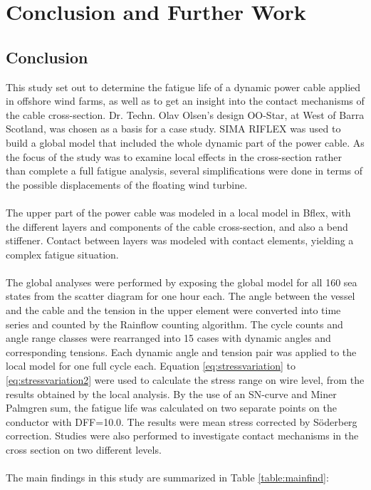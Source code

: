 \chapter{Conclusion and Further Work}
\label{chap:conclusion}
\section{Conclusion}
This study set out to determine the fatigue life of a dynamic power cable applied in offshore wind farms, as well as to get an insight into the contact mechanisms of the cable cross-section. Dr. Techn. Olav Olsen's design OO-Star, at West of Barra Scotland, was chosen as a basis for a case study. SIMA RIFLEX was used to build a global model that included the whole dynamic part of the power cable.  As the focus of the study was to examine local effects in the cross-section rather than complete a full fatigue analysis, several simplifications were done in terms of the possible displacements of the floating wind turbine. \\\\The upper part of the power cable was modeled in a local model in Bflex, with the different layers and components of the cable cross-section, and also a bend stiffener. Contact between layers was modeled with contact elements, yielding a complex fatigue situation.\\\\
The global analyses were performed by exposing the global model for all 160 sea states from the scatter diagram for one hour each. The angle between the vessel and the cable and the tension in the upper element were converted into time series and counted by the Rainflow counting algorithm. The cycle counts and angle range classes were rearranged into 15 cases with dynamic angles and corresponding tensions. Each dynamic angle and tension pair was applied to the local model for one full cycle each. Equation \ref{eq:stressvariation} to \ref{eq:stressvariation2} were used to calculate the stress range on wire level, from the results obtained by the local analysis. By the use of an SN-curve and Miner Palmgren sum, the fatigue life was calculated on two separate points on the conductor with DFF=10.0. The results were mean stress corrected by Söderberg correction. Studies were also performed to investigate contact mechanisms in the cross section on two different levels.
\\\\The main findings in this study are summarized in Table \ref{table:mainfind}:

